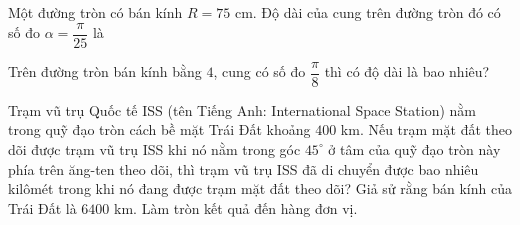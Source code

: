 \begin{bt}%

	Một đường tròn có bán kính $R=75$ cm. Độ dài của cung trên đường tròn đó có số đo $\alpha =\dfrac{\pi}{25}$ là 
\end{bt}

\begin{bt}%

	Trên đường tròn bán kính bằng $4$, cung có số đo $\dfrac{\pi}{8}$ thì có độ dài là bao nhiêu? 
\end{bt}

\begin{bt}%

	Trạm vũ trụ Quốc tế ISS (tên Tiếng Anh: International Space Station) nằm trong quỹ đạo tròn cách bề mặt Trái Đất khoảng $400$ km. Nếu trạm mặt đất theo dõi được trạm vũ trụ ISS khi nó nằm trong góc $45^\circ$ ở tâm của quỹ đạo tròn này phía trên ăng-ten theo dõi, thì trạm vũ trụ ISS đã di chuyển được bao nhiêu kilômét trong khi nó đang được trạm mặt đất theo dõi? Giả sử rằng bán kính của Trái Đất là $6400$ km. Làm tròn kết quả đến hàng đơn vị. 
\end{bt}

